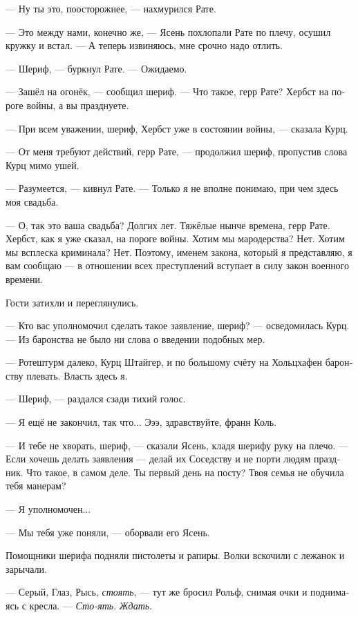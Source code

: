 \documentclass[a4paper,12pt,fleqn]{book}\usepackage{cooltooltips}\usepackage{polyglossia}\setdefaultlanguage[babelshorthands=true]{russian}\setotherlanguage{english}\defaultfontfeatures{Ligatures=TeX,Mapping=tex-text} \usepackage{xcolor}\definecolor{lightgray}{HTML}{bbbbbb}\color{lightgray}\newcommand{\ml}[3]{\textenglish{\textcolor{black}{#3}}}
\newcommand{\asterism}{\vspace{1em}{\centering\Large\bfseries$\ast~\ast~\ast$\par}\vspace{1em}}
\begin{document}
--- Ну ты это, поосторожнее, --- нахмурился Рате.

--- Это между нами, конечно же, --- Ясень похлопали Рате по плечу, осушил кружку и встал.
--- А теперь извиняюсь, мне срочно надо отлить.

\asterism

--- Шериф, --- буркнул Рате.
--- Ожидаемо.

--- Зашёл на огонёк, --- сообщил шериф.
--- Что такое, герр Рате?
Хербст на пороге войны, а вы празднуете.

--- При всем уважении, шериф, Хербст уже в состоянии войны, --- сказала Курц.

--- От меня требуют действий, герр Рате, --- продолжил шериф, пропустив слова Курц мимо ушей.

--- Разумеется, --- кивнул Рате.
--- Только я не вполне понимаю, при чем здесь моя свадьба.

--- О, так это ваша свадьба?
Долгих лет.
Тяжёлые нынче времена, герр Рате.
Хербст, как я уже сказал, на пороге войны.
Хотим мы мародерства?
Нет.
Хотим мы всплеска криминала?
Нет.
Поэтому, именем закона, который я представляю, я вам сообщаю --- в отношении всех преступлений вступает в силу закон военного времени.

Гости затихли и переглянулись.

--- Кто вас уполномочил сделать такое заявление, шериф? --- осведомилась Курц.
--- Из баронства не было ни слова о введении подобных мер.

--- Ротештурм далеко, Курц Штайгер, и по большому счёту на Хольцхафен баронству плевать.
Власть здесь я.

--- Шериф, --- раздался сзади тихий голос.

--- Я ещё не закончил, так что...
Эээ, здравствуйте, франн Коль.

--- И тебе не хворать, шериф, --- сказали Ясень, кладя шерифу руку на плечо.
--- Если хочешь делать заявления --- делай их Соседству и не порти людям праздник.
Что такое, в самом деле.
Ты первый день на посту?
Твоя семья не обучила тебя манерам?

--- Я уполномочен...

--- Мы тебя уже поняли, --- оборвали его Ясень.

Помощники шерифа подняли пистолеты и рапиры.
Волки вскочили с лежанок и зарычали.

--- Серый, Глаз, Рысь, \textit{стоять}, --- тут же бросил Рольф, снимая очки и поднимаясь с кресла.
--- \textit{Сто-ять}.
\textit{Ждать}.
\end{document}
